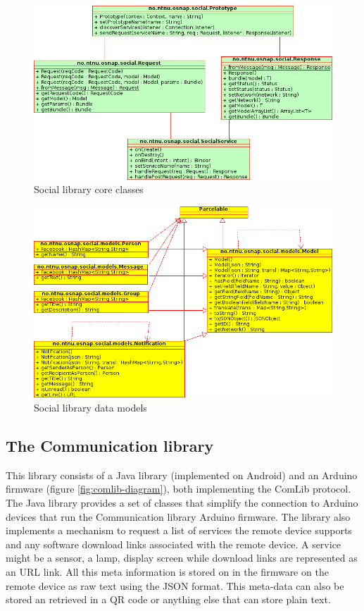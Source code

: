 \begin{figure}[h!]
	\centering \includegraphics[scale=0.7]{img/architecture-socialclasses.png}
	\caption{Social library core classes}
	\label{fig:social-classes}
\end{figure}

\begin{figure}[h!]
	\centering \includegraphics[scale=0.7]{img/architecture-modelclasses.png}
	\caption{Social library data models}
	\label{fig:model-classes}
\end{figure}


\subsection{The Communication library}
This library consists of a Java library (implemented on Android) and an Arduino firmware (figure \ref{fig:comlib-diagram}),
both implementing the ComLib protocol. The Java library provides a set of classes that simplify the connection to Arduino
devices that run the Communication library Arduino firmware. The library also implements a mechanism to request a list of 
services the remote device supports and any software download links associated with the remote device. A service might
be a sensor, a lamp, display screen while download links are represented as an URL link. All this meta information is stored
on in the firmware on the remote device as raw text using the JSON format. This meta-data can also be stored an retrieved
in a QR code or anything else that can store plain text.

